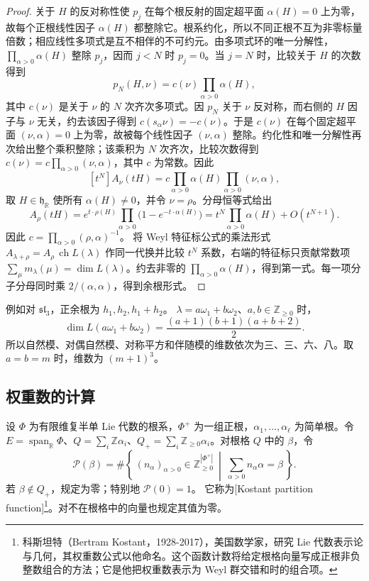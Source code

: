 \begin{proof}
	关于 \(H\) 的反对称性使 \(p_j\) 在每个根反射的固定超平面 \(\alpha(H)=0\) 上为零，故每个正根线性因子 \(\alpha(H)\) 都整除它。根系约化，所以不同正根不互为非零标量倍数；相应线性多项式是互不相伴的不可约元。由多项式环的唯一分解性， \(\prod_{\alpha>0}\alpha(H)\) 整除 \(p_j\)，因而 \(j<N\) 时 \(p_j=0\)。当 \(j=N\) 时，比较关于 \(H\) 的次数得到
	\[
		p_N(H,\nu)=c(\nu)\prod_{\alpha>0}\alpha(H),
	\]
	其中 \(c(\nu)\) 是关于 \(\nu\) 的 \(N\) 次齐次多项式。因 \(p_N\) 关于 \(\nu\) 反对称，而右侧的 \(H\) 因子与 \(\nu\) 无关，约去该因子得到 \(c(s_\alpha\nu)=-c(\nu)\)。于是 \(c(\nu)\) 在每个固定超平面 \((\nu,\alpha)=0\) 上为零，故被每个线性因子 \((\nu,\alpha)\) 整除。约化性和唯一分解性再次给出整个乘积整除；该乘积为 \(N\) 次齐次，比较次数得到 \(c(\nu)=c\prod_{\alpha>0}(\nu,\alpha)\)，其中 \(c\) 为常数。因此
	\[
		[t^N]A_\nu(tH) =c\prod_{\alpha>0}\alpha(H)\prod_{\alpha>0}(\nu,\alpha),
	\]
	取 \(H\in\mathfrak h_{\mathbb R}\) 使所有 \(\alpha(H)\ne0\)，并令 \(\nu=\rho\)。分母恒等式给出
	\[
		A_\rho(tH) =e^{t\cdot\rho(H)}\prod_{\alpha>0}\bigl(1-e^{-t\cdot\alpha(H)}\bigr) =t^N\prod_{\alpha>0}\alpha(H)+O(t^{N+1}).
	\]
	因此 \(c=\prod_{\alpha>0}(\rho,\alpha)^{-1}\)。 将 Weyl 特征标公式的乘法形式 \(A_{\lambda+\rho}=A_\rho\,\operatorname{ch}L(\lambda)\) 作同一代换并比较 \(t^N\) 系数，右端的特征标只贡献常数项 \(\sum_\mu m_\lambda(\mu)=\dim L(\lambda)\)。约去非零的 \(\prod_{\alpha>0}\alpha(H)\)，得到第一式。每一项分子分母同时乘 \(2/(\alpha,\alpha)\)，得到余根形式。
\end{proof}

例如对 \(\mathfrak{sl}_3\)，正余根为 \(h_1,h_2,h_1+h_2\)。 \(\lambda=a\omega_1+b\omega_2\)、\(a,b\in\mathbb Z_{\ge0}\) 时，
\[
	\dim L(a\omega_1+b\omega_2) =\frac{(a+1)(b+1)(a+b+2)}2.
\]
所以自然模、对偶自然模、对称平方和伴随模的维数依次为三、三、六、八。取 \(a=b=m\) 时，维数为 \((m+1)^3\)。

\subsection{权重数的计算}
\label{b5:subsec:1905:02}

\begin{definition}\label{b5:def:kostant-partition}
	设 \(\Phi\) 为有限维复半单 Lie 代数的根系，\(\Phi^+\) 为一组正根，\(\alpha_1,\ldots,\alpha_\ell\) 为简单根。令 \(E=\operatorname{span}_{\mathbb R}\Phi\)、\(Q=\sum_i\mathbb Z\alpha_i\)、\(Q_+=\sum_i\mathbb Z_{\ge0}\alpha_i\)。对根格 \(Q\) 中的 \(\beta\)，令
	\[
		\mathcal P(\beta) =\#\left\{\,(n_\alpha)_{\alpha>0}\in\mathbb Z_{\ge0}^{|\Phi^+|} \ \middle|\ \sum_{\alpha>0}n_\alpha\alpha=\beta\,\right\}.
	\]
	若 \(\beta\notin Q_+\)，规定为零；特别地 \(\mathcal P(0)=1\)。 它称为[Kostant partition function]\footnote{科斯坦特（Bertram Kostant，1928-2017），美国数学家，研究 Lie 代数表示论与几何，其权重数公式以他命名。这个函数计数将给定根格向量写成正根非负整数组合的方法；它是他把权重数表示为 Weyl 群交错和时的组合项。}。对不在根格中的向量也规定其值为零。
\end{definition}

